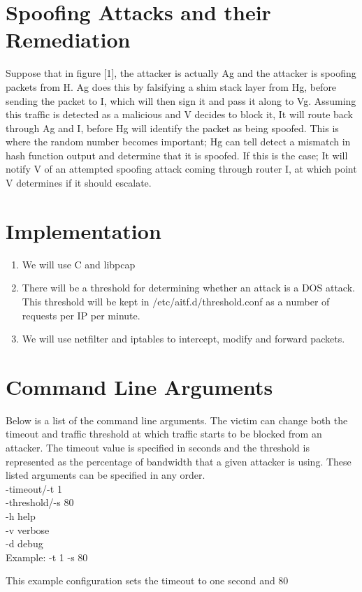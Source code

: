 \documentclass[11pt]{article}
\begin{document}
\section{Spoofing Attacks and their Remediation}
Suppose that in figure [1], the attacker is actually Ag and the attacker is
spoofing packets from H. Ag does this by falsifying a shim stack layer from Hg,
before sending the packet to I, which will then sign it and pass it along to
Vg. Assuming this traffic is detected as a malicious and V decides to block it,
It will route back through Ag and I, before Hg will identify the packet as
being spoofed. This is where the random number becomes important; Hg can tell
detect a mismatch in hash function output and determine that it is spoofed. If
this is the case; It will notify V of an attempted spoofing attack coming
through router I, at which point V determines if it should escalate.


\section{Implementation}
\begin{enumerate}
	\item We will use C and libpcap
	\item There will be a threshold for determining whether an attack is a DOS
	attack. This threshold will be kept in /etc/aitf.d/threshold.conf as a
	number of requests per IP per minute.
	\item We will use netfilter and iptables to intercept, modify and forward
	packets.
\end{enumerate}

\section{Command Line Arguments}
Below is a list of the command line arguments. The victim can change both the timeout and traffic threshold at which traffic starts to be blocked from an attacker. The timeout value is specified in seconds and the threshold is represented as the percentage of bandwidth that a given attacker is using. These listed arguments can be specified in any order.  \\
-timeout/-t 1 \\
-threshold/-s 80 \\
-h help \\
-v verbose \\
-d debug \\


Example: -t 1 -s 80

This example configuration sets the timeout to one second and 80%
\end{document}
